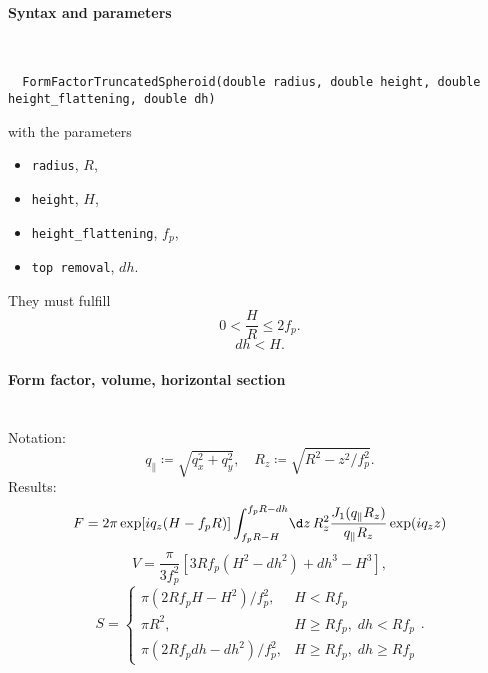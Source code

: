 \paragraph{Syntax and parameters}\strut\\[-2ex plus .2ex minus .2ex]
\begin{lstlisting}
  FormFactorTruncatedSpheroid(double radius, double height, double height_flattening, double dh)
\end{lstlisting}
with the parameters
\begin{itemize}
\item \texttt{radius}, $R$,
\item \texttt{height}, $H$,
\item \texttt{height\_flattening}, $f_p$,
\item \texttt{top removal}, $dh$.
\end{itemize}
They must fulfill
\begin{equation*}
  0< \dfrac{H}{R}\le 2f_p.
\end{equation*}
\begin{equation*}
  dh < H.
\end{equation*}

\paragraph{Form factor, volume, horizontal section}\strut\\
Notation:
\begin{equation*}
  q_{\parallel} \coloneqq \sqrt{q_x^2+q_y^2}, \quad
  R_z \coloneqq \sqrt{R^2-z^2/f_p^2}.
\end{equation*}
Results:
\begin{equation*}
F =   2\pi \exp[iq_z(H-f_pR)] \int_{f_p R-H}^{f_p R-dh} \!\d z\,
     R_z^2\frac{J_1(q_{\parallel}R_z)}{q_{\parallel}R_z} \exp(i q_z z)
\end{equation*}
\begin{equation*}
  V=\frac{\pi}{3f_p^2} \left[ 3R f_p\left(H^2-dh^2\right) +dh^3 - H^3 \right],
\end{equation*}
\begin{equation*}
  S = \left\{\begin{array}{ll} \pi\left(2Rf_pH-H^2\right)/f_p^2, & H < Rf_p \\
                               \pi R^2, & H \geq Rf_p,\; dh < Rf_p \\
                               \pi\left(2Rf_pdh-dh^2\right)/f_p^2, & H \geq Rf_p,\; dh \geq Rf_p
                                 \end{array}\right..
\end{equation*}

